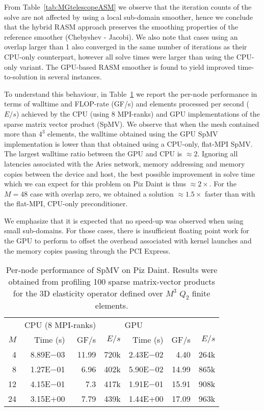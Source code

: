 \documentclass[]{siamart0216}
\begin{document}
From Table~\ref{tab:MGtelescopeASM} we observe that the iteration counts of the solve are not affected by using a local sub-domain smoother, 
hence we conclude that the hybrid RASM approach preserves the smoothing properties of the reference smoother (Chebyshev - Jacobi).
We also note that cases using an overlap larger than 1 also converged in the same number of iterations as their CPU-only counterpart, however 
all solve times were larger than using the CPU-only variant. The GPU-based RASM smoother is found to yield improved time-to-solution 
in several instances. 



To understand this behaviour, in Table~\ref{tab:spmv} we report the per-node performance in terms of walltime and FLOP-rate (GF/s) and elements processed per second ($E/s$) achieved by the CPU (using 8 MPI-ranks) and GPU implementations of the sparse matrix vector product (SpMV). 
We observe that when the mesh contained more than $4^3$ elements, the walltime obtained using the GPU SpMV implementation is lower than that obtained using a CPU-only, flat-MPI SpMV.
The largest walltime ratio between the GPU and CPU is $\approx 2$. Ignoring all latencies associated with the Aries network, memory addressing and memory copies between the device and host, the best possible improvement in solve time which we can expect for this problem on Piz Daint is  thus $\approx 2\times$.
For the $M=48$ case with overlap zero, we obtained a solution $\approx 1.5\times$ faster than with the flat-MPI, CPU-only preconditioner.

We emphasize that it is expected that no speed-up was observed when using small sub-domains. For those cases, there is insufficient floating point work for the GPU to perform to offset the overhead associated with kernel launches and the memory copies passing through the PCI Express.

\begin{table}[h!]
\centering
\caption{Per-node performance of SpMV on Piz Daint.
Results were obtained from profiling 100 sparse matrix-vector products for the 
3D elasticity operator defined over $M^3$  $Q_2$ finite elements. 
}
\begin{tabular}{r r r r r r r}
\toprule
	   &\multicolumn{2}{c}{CPU (8 MPI-ranks)}	&\multicolumn{2}{c}{GPU} \\
$M$    &Time (s)     &GF/s   &$E/s$  &Time (s)     &GF/s &$E/s$\\
\toprule
4	&8.89E$-$03	&11.99	&720k &2.43E$-$02	&4.40 &264k\\
8	&1.27E$-$01	&6.96	&402k &5.90E$-$02	&14.99 &865k\\
12	&4.15E$-$01	&7.3		&417k &1.91E$-$01	&15.91 &908k\\ 24	&3.15E$+$00	&7.79	&439k &1.44E$+$00	&17.09 &963k\\
\bottomrule
\end{tabular}
\label{tab:spmv}
\end{table}
\end{document}
